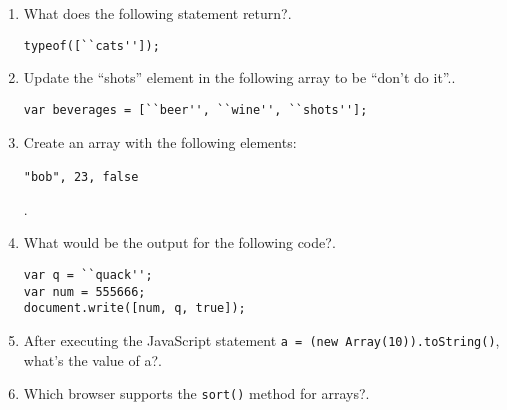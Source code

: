 \documentclass[11pt,a4paper]{article}
\begin{document}
\begin{enumerate}
\begin{lstlisting}
\end{lstlisting}
\item What does the following statement return?\underline{\hspace{3cm}}.
\begin{lstlisting} 
typeof([``cats'']);
\end{lstlisting}
\item Update the ``shots'' element in the following array to be ``don't do it''.\underline{\hspace{3cm}}.
\begin{lstlisting}
var beverages = [``beer'', ``wine'', ``shots''];
\end{lstlisting}
\item Create an array with the following elements:\

\texttt{"bob", 23, false}\

\underline{\hspace{3cm}}.
\item What would be the output for the following code?\underline{\hspace{3cm}}.
\begin{lstlisting}
var q = ``quack'';
var num = 555666;
document.write([num, q, true]);
\end{lstlisting}
\item After executing the JavaScript statement \texttt{a = (new Array(10)).toString()}, what's the value of a?\underline{\hspace{3cm}}.
\item Which browser supports the \texttt{sort()} method for arrays?\underline{\hspace{3cm}}.
\end{enumerate}
\end{document}

